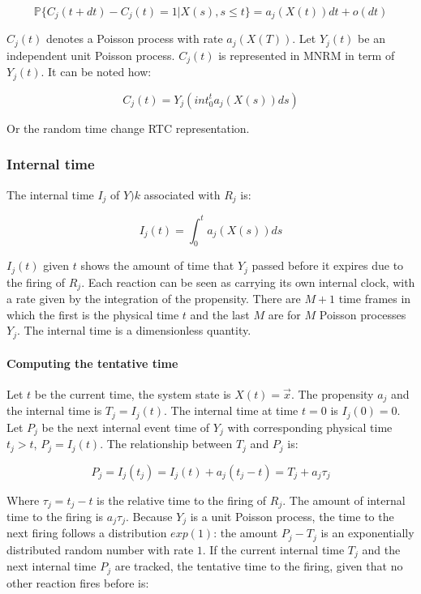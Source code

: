     $$\mathbb{P}\{C_j(t+dt)-C_j(t) = 1|X(s),s\le t\} = a_j(X(t))dt + o(dt)$$

    $C_j(t)$ denotes a Poisson process with rate $a_j(X(T))$.
    Let $Y_j(t)$ be an independent unit Poisson process.
    $C_j(t)$ is represented in MNRM in term of $Y_j(t)$.
    It can be noted how:

    $$C_j(t) = Y_j\left(int_0^t a_j(X(s))ds\right)$$

    Or the random time change RTC representation.

    \subsubsection{Internal time}
    The internal time $I_j$ of $Y)k$ associated with $R_j$ is:

    $$I_j(t) = \int_0^ta_j(X(s))ds$$

    $I_j(t)$ given $t$ shows the amount of time that $Y_j$ passed before it expires due to the firing of $R_j$.
    Each reaction can be seen as carrying its own internal clock, with a rate given by the integration of the propensity.
    There are $M+1$ time frames in which the first is the physical time $t$ and the last $M$ are for $M$ Poisson processes $Y_j$.
    The internal time is a dimensionless quantity.

      \paragraph{Computing the tentative time}
      Let $t$ be the current time, the system state is $X(t) = \vec{x}$.
      The propensity $a_j$ and the internal time is $T_j = I_j(t)$.
      The internal time at time $t=0$ is $I_j(0) = 0$.
      Let $P_j$ be the next internal event time of $Y_j$ with corresponding physical time $t_j>t$, $P_j = I_j(t)$.
      The relationship between $T_j$ and $P_j$ is:

      $$P_j = I_j(t_j) = I_j(t) + a_j(t_j-t) = T_j+a_j\tau_j$$

      Where $\tau_j = t_j-t$ is the relative time to the firing of $R_j$.
      The amount of internal time to the firing is $a_j\tau_j$.
      Because $Y_j$ is a unit Poisson process, the time to the next firing follows a distribution $exp(1)$: the amount $P_j-T_j$ is an exponentially distributed random number with rate $1$.
      If the current internal time $T_j$ and the next internal time $P_j$ are tracked, the tentative time to the firing, given that no other reaction fires before is:

